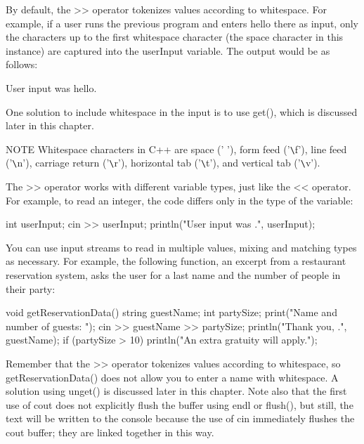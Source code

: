By default, the >{}> operator tokenizes values according to whitespace. For example, if a user runs the previous program and enters hello there as input, only the characters up to the first whitespace character (the space character in this instance) are captured into the userInput variable. The output would be as follows:

\begin{shell}
User input was hello.
\end{shell}

One solution to include whitespace in the input is to use get(), which is discussed later in this chapter.

\begin{myNotic}{NOTE}
Whitespace characters in C++ are space (' '), form feed ('\verb|\|f'), line feed ('\verb|\|n'), carriage return ('\verb|\|r'), horizontal tab ('\verb|\|t'), and vertical tab ('\verb|\|v').
\end{myNotic}

The >{}> operator works with different variable types, just like the <{}< operator. For example, to read an integer, the code differs only in the type of the variable:

\begin{cpp}
int userInput;
cin >> userInput;
println("User input was {}.", userInput);
\end{cpp}

You can use input streams to read in multiple values, mixing and matching types as necessary. For example, the following function, an excerpt from a restaurant reservation system, asks the user for a last name and the number of people in their party:

\begin{cpp}
void getReservationData()
{
    string guestName;
    int partySize;
    print("Name and number of guests: ");
    cin >> guestName >> partySize;
    println("Thank you, {}.", guestName);
    if (partySize > 10) {
        println("An extra gratuity will apply.");
    }
}
\end{cpp}

Remember that the >{}> operator tokenizes values according to whitespace, so getReservationData() does not allow you to enter a name with whitespace. A solution using unget() is discussed later in this chapter. Note also that the first use of cout does not explicitly flush the buffer using endl or flush(), but still, the text will be written to the console because the use of cin immediately flushes the cout buffer; they are linked together in this way.


